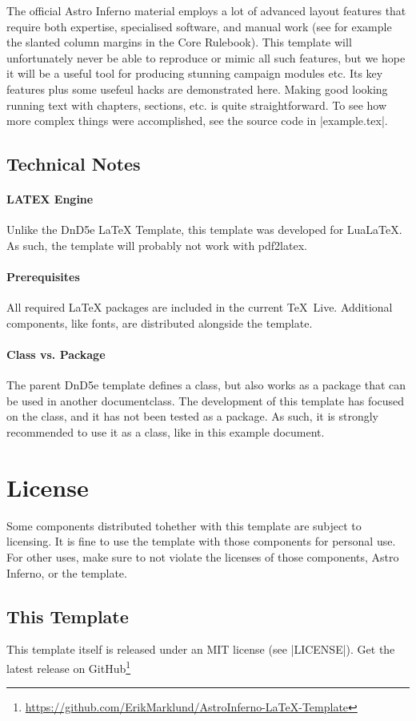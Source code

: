 \documentclass[letterpaper,twocolumn,openany,nodeprecatedcode]{astroinfernobook}
\begin{document}
The official Astro Inferno material employs a lot of advanced layout
features that require both expertise, specialised software, and manual
work (see for example the slanted column margins in the Core Rulebook).
This template will unfortunately never be able to reproduce or mimic
all such features, but we hope it will be a useful tool for producing
stunning campaign modules etc. Its key features plus some usefeul hacks are demonstrated here.
Making good looking running text with chapters, sections, etc. is quite straightforward.
To see how more complex things were accomplished, see the source code in |example.tex|.

\subsection{Technical Notes}
\paragraph{LATEX Engine}
Unlike the DnD5e LaTeX Template, this template was developed for LuaLaTeX.
As such, the template will probably not work with pdf2latex.
\paragraph{Prerequisites}
All required \LaTeX{} packages are included in the current TeX~Live.
Additional components, like fonts, are distributed alongside the template.
\paragraph{Class vs. Package}
The parent DnD5e template defines a class, but also works as a package that can be used in another documentclass.
The development of this template has focused on the class, and it has not been tested as a package.
As such, it is strongly recommended to use it as a class, like in this example document.

\newpage
\section{License}
Some components distributed tohether with this template are subject to licensing. It is fine
to use the template with those components for personal use. For other uses, make sure to not
violate the licenses of those components, Astro Inferno, or the template.

\subsection{This Template}
This template itself is released under an MIT license (see
|LICENSE|). Get the latest release on GitHub\footnote{\url{https://github.com/ErikMarklund/AstroInferno-LaTeX-Template}}
\end{document}
